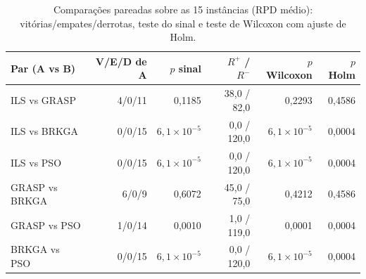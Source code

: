 \begin{table}[t]
\centering
\caption{Comparações pareadas sobre as 15 instâncias (RPD médio): vitórias/empates/derrotas, teste do sinal e teste de Wilcoxon com ajuste de Holm.}
\label{tab:pairwise}
\footnotesize
\begin{tabular}{@{}lrrrrr@{}}
\toprule
Par (A vs B) & V/E/D de A & $p$ sinal & $R^+$ / $R^-$ & $p$ Wilcoxon & $p$ Holm \\
\midrule
ILS vs GRASP & 4/0/11 & 0,1185 & 38,0 / 82,0 & 0,2293 & 0,4586 \\
ILS vs BRKGA & 0/0/15 & $6,1\times10^{-5}$ & 0,0 / 120,0 & $6,1\times10^{-5}$ & 0,0004 \\
ILS vs PSO & 0/0/15 & $6,1\times10^{-5}$ & 0,0 / 120,0 & $6,1\times10^{-5}$ & 0,0004 \\
GRASP vs BRKGA & 6/0/9 & 0,6072 & 45,0 / 75,0 & 0,4212 & 0,4586 \\
GRASP vs PSO & 1/0/14 & 0,0010 & 1,0 / 119,0 & 0,0001 & 0,0004 \\
BRKGA vs PSO & 0/0/15 & $6,1\times10^{-5}$ & 0,0 / 120,0 & $6,1\times10^{-5}$ & 0,0004 \\
\bottomrule
\end{tabular}
\end{table}
